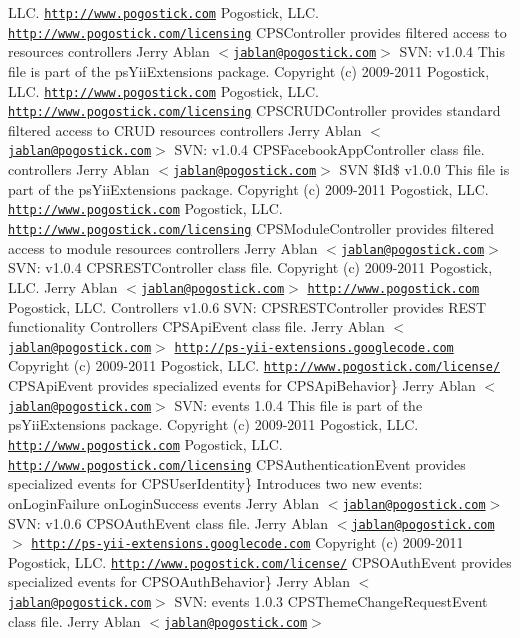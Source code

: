 LLC.  \href{http://www.pogostick.com}{\tt http://www.pogostick.com} Pogostick, LLC.  \href{http://www.pogostick.com/licensing}{\tt http://www.pogostick.com/licensing} CPSController provides filtered access to resources   controllers   Jerry Ablan $<$\href{mailto:jablan@pogostick.com}{\tt jablan@pogostick.com}$>$  SVN:   v1.0.4    This file is part of the psYiiExtensions package.   Copyright (c) 2009-\/2011 Pogostick, LLC.  \href{http://www.pogostick.com}{\tt http://www.pogostick.com} Pogostick, LLC.  \href{http://www.pogostick.com/licensing}{\tt http://www.pogostick.com/licensing} CPSCRUDController provides standard filtered access to CRUD resources   controllers   Jerry Ablan $<$\href{mailto:jablan@pogostick.com}{\tt jablan@pogostick.com}$>$  SVN:   v1.0.4    CPSFacebookAppController class file.   controllers   Jerry Ablan $<$\href{mailto:jablan@pogostick.com}{\tt jablan@pogostick.com}$>$  SVN \$Id\$  v1.0.0    This file is part of the psYiiExtensions package.   Copyright (c) 2009-\/2011 Pogostick, LLC.  \href{http://www.pogostick.com}{\tt http://www.pogostick.com} Pogostick, LLC.  \href{http://www.pogostick.com/licensing}{\tt http://www.pogostick.com/licensing} CPSModuleController provides filtered access to module resources   controllers   Jerry Ablan $<$\href{mailto:jablan@pogostick.com}{\tt jablan@pogostick.com}$>$  SVN:   v1.0.4    CPSRESTController class file.    Copyright (c) 2009-\/2011 Pogostick, LLC.  Jerry Ablan $<$\href{mailto:jablan@pogostick.com}{\tt jablan@pogostick.com}$>$  \href{http://www.pogostick.com}{\tt http://www.pogostick.com} Pogostick, LLC.   Controllers  v1.0.6  SVN:       CPSRESTController provides REST functionality   Controllers  CPSApiEvent class file.   Jerry Ablan $<$\href{mailto:jablan@pogostick.com}{\tt jablan@pogostick.com}$>$  \href{http://ps-yii-extensions.googlecode.com}{\tt http://ps-\/yii-\/extensions.googlecode.com}  Copyright (c) 2009-\/2011 Pogostick, LLC.  \href{http://www.pogostick.com/license/}{\tt http://www.pogostick.com/license/} CPSApiEvent provides specialized events for  CPSApiBehavior\}   Jerry Ablan $<$\href{mailto:jablan@pogostick.com}{\tt jablan@pogostick.com}$>$  SVN:    events  1.0.4    This file is part of the psYiiExtensions package.   Copyright (c) 2009-\/2011 Pogostick, LLC.  \href{http://www.pogostick.com}{\tt http://www.pogostick.com} Pogostick, LLC.  \href{http://www.pogostick.com/licensing}{\tt http://www.pogostick.com/licensing} CPSAuthenticationEvent provides specialized events for  CPSUserIdentity\} Introduces two new events:  onLoginFailure onLoginSuccess   events   Jerry Ablan $<$\href{mailto:jablan@pogostick.com}{\tt jablan@pogostick.com}$>$  SVN:   v1.0.6    CPSOAuthEvent class file.   Jerry Ablan $<$\href{mailto:jablan@pogostick.com}{\tt jablan@pogostick.com}$>$  \href{http://ps-yii-extensions.googlecode.com}{\tt http://ps-\/yii-\/extensions.googlecode.com}  Copyright (c) 2009-\/2011 Pogostick, LLC.  \href{http://www.pogostick.com/license/}{\tt http://www.pogostick.com/license/} CPSOAuthEvent provides specialized events for  CPSOAuthBehavior\}   Jerry Ablan $<$\href{mailto:jablan@pogostick.com}{\tt jablan@pogostick.com}$>$  SVN:    events   1.0.3    CPSThemeChangeRequestEvent class file.   Jerry Ablan $<$\href{mailto:jablan@pogostick.com}{\tt jablan@pogostick.com}$>$  